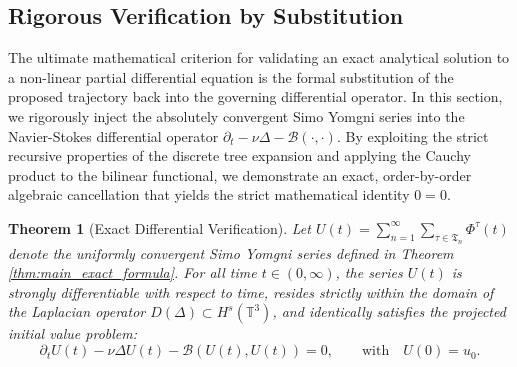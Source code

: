 \documentclass[12pt,a4paper]{article}
\theoremstyle{plain}
\newtheorem{theorem}{Theorem}[section]
\theoremstyle{definition}
\theoremstyle{remark}
\newcommand{\Hs}{H^s}
\newcommand{\T}{\mathbb{T}}
\newcommand{\BB}{\mathcal{B}}
\newcommand{\fT}{\mathfrak{T}}
\begin{document}
\subsection{Rigorous Verification by Substitution}
\label{subsec:substitution}

The ultimate mathematical criterion for validating an exact analytical solution to a non-linear partial differential equation is the formal substitution of the proposed trajectory back into the governing differential operator. In this section, we rigorously inject the absolutely convergent Simo Yomgni series into the Navier-Stokes differential operator $\partial_t - \nu \Delta - \BB(\cdot, \cdot)$. By exploiting the strict recursive properties of the discrete tree expansion and applying the Cauchy product to the bilinear functional, we demonstrate an exact, order-by-order algebraic cancellation that yields the strict mathematical identity $0 = 0$.



\begin{theorem}[Exact Differential Verification]
\label{thm:exact_verification}
Let $U(t) = \sum_{n=1}^\infty \sum_{\tau \in \fT_n} \Phi^\tau(t)$ denote the uniformly convergent Simo Yomgni series defined in Theorem \ref{thm:main_exact_formula}. For all time $t \in (0, \infty)$, the series $U(t)$ is strongly differentiable with respect to time, resides strictly within the domain of the Laplacian operator $D(\Delta) \subset \Hs(\T^3)$, and identically satisfies the projected initial value problem:
\[
  \partial_t U(t) - \nu \Delta U(t) - \BB(U(t), U(t)) = 0, \qquad \text{with} \quad U(0) = u_0.
\]
\end{theorem}
\end{document}
